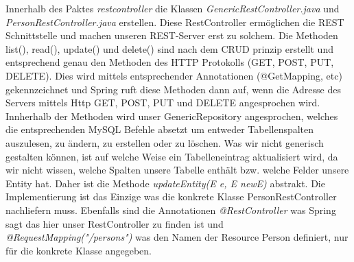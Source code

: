 \documentclass[11pt]{scrartcl}
\begin{document}
Innerhalb des Paktes \textit{restcontroller} die Klassen 
\textit{GenericRestController.java} und \textit{PersonRestController.java}
erstellen. Diese RestController ermöglichen die REST Schnittstelle
und machen unseren REST-Server erst zu solchem. Die Methoden list(), read(),
update() und delete() sind nach dem CRUD prinzip erstellt und 
entsprechend genau den Methoden des HTTP Protokolls (GET, POST, PUT, DELETE).
Dies wird mittels entsprechender Annotationen (@GetMapping, etc) gekennzeichnet
und Spring ruft diese Methoden dann auf, wenn die Adresse des Servers 
mittels Http GET, POST, PUT und DELETE angesprochen wird.
Innherhalb der Methoden wird unser GenericRepository angesprochen,
welches die entsprechenden MySQL Befehle absetzt um entweder 
Tabellenspalten auszulesen, zu ändern, zu erstellen oder zu löschen.
Was wir nicht generisch gestalten können, ist auf welche Weise
ein Tabelleneintrag aktualisiert wird, da wir nicht wissen, welche 
Spalten unsere Tabelle enthält bzw. welche Felder unsere Entity hat.
Daher ist die Methode \textit{updateEntity(E e, E newE)} abstrakt.
Die Implementierung ist das Einzige was die konkrete Klasse 
PersonRestController nachliefern muss.
Ebenfalls sind die Annotationen \textit{@RestController} was Spring sagt
das hier unser RestController zu finden ist und \textit{@RequestMapping("/persons")}
was den Namen der Resource Person definiert, nur für die konkrete Klasse 
angegeben.
\end{document}
